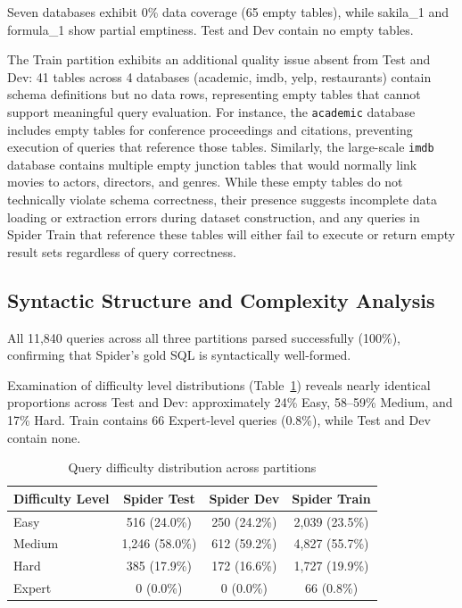 \documentclass[print]{einformatica}
\begin{document}
Seven databases exhibit 0\% data coverage (65 empty tables), while sakila\_1 and formula\_1 show partial emptiness. Test and Dev contain no empty tables.

The Train partition exhibits an additional quality issue absent from Test and Dev: 41 tables across 4 databases (academic, imdb, yelp, restaurants) contain schema definitions but no data rows, representing empty tables that cannot support meaningful query evaluation. For instance, the \texttt{academic} database includes empty tables for conference proceedings and citations, preventing execution of queries that reference those tables. Similarly, the large-scale \texttt{imdb} database contains multiple empty junction tables that would normally link movies to actors, directors, and genres. While these empty tables do not technically violate schema correctness, their presence suggests incomplete data loading or extraction errors during dataset construction, and any queries in Spider Train that reference these tables will either fail to execute or return empty result sets regardless of query correctness.

\subsection{Syntactic Structure and Complexity Analysis}\label{sec:syntax_results}

All 11,840 queries across all three partitions parsed successfully (100\%), confirming that Spider's gold SQL is syntactically well-formed.

Examination of difficulty level distributions (Table~\ref{tab:difficulty}) reveals nearly identical proportions across Test and Dev: approximately 24\% Easy, 58--59\% Medium, and 17\% Hard. Train contains 66 Expert-level queries (0.8\%), while Test and Dev contain none.

\begin{table}[ht]
    \caption{Query difficulty distribution across partitions}
    \label{tab:difficulty}
    \centering
    \footnotesize
    \begin{tabular}{lccc}
        \toprule
        \textbf{Difficulty Level} & \textbf{Spider Test} & \textbf{Spider Dev} & \textbf{Spider Train} \\
        \midrule
        Easy & 516 (24.0\%) & 250 (24.2\%) & 2,039 (23.5\%) \\
        Medium & 1,246 (58.0\%) & 612 (59.2\%) & 4,827 (55.7\%) \\
        Hard & 385 (17.9\%) & 172 (16.6\%) & 1,727 (19.9\%) \\
        Expert & 0 (0.0\%) & 0 (0.0\%) & 66 (0.8\%) \\
        \bottomrule
    \end{tabular}
\end{table}
\end{document}
